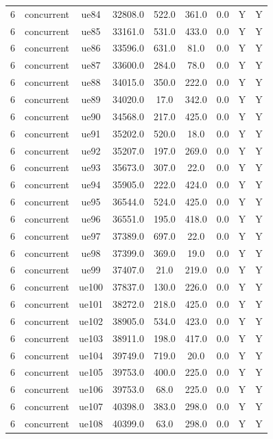 \begin{table}[ht]
\begin{tabular}{|c|c|c|c|c|c|c|c|c|}
6 & concurrent & ue84 & 32808.0 & 522.0 & 361.0 & 0.0 & Y & Y \\
6 & concurrent & ue85 & 33161.0 & 531.0 & 433.0 & 0.0 & Y & Y \\
6 & concurrent & ue86 & 33596.0 & 631.0 & 81.0 & 0.0 & Y & Y \\
6 & concurrent & ue87 & 33600.0 & 284.0 & 78.0 & 0.0 & Y & Y \\
6 & concurrent & ue88 & 34015.0 & 350.0 & 222.0 & 0.0 & Y & Y \\
6 & concurrent & ue89 & 34020.0 & 17.0 & 342.0 & 0.0 & Y & Y \\
6 & concurrent & ue90 & 34568.0 & 217.0 & 425.0 & 0.0 & Y & Y \\
6 & concurrent & ue91 & 35202.0 & 520.0 & 18.0 & 0.0 & Y & Y \\
6 & concurrent & ue92 & 35207.0 & 197.0 & 269.0 & 0.0 & Y & Y \\
6 & concurrent & ue93 & 35673.0 & 307.0 & 22.0 & 0.0 & Y & Y \\
6 & concurrent & ue94 & 35905.0 & 222.0 & 424.0 & 0.0 & Y & Y \\
6 & concurrent & ue95 & 36544.0 & 524.0 & 425.0 & 0.0 & Y & Y \\
6 & concurrent & ue96 & 36551.0 & 195.0 & 418.0 & 0.0 & Y & Y \\
6 & concurrent & ue97 & 37389.0 & 697.0 & 22.0 & 0.0 & Y & Y \\
6 & concurrent & ue98 & 37399.0 & 369.0 & 19.0 & 0.0 & Y & Y \\
6 & concurrent & ue99 & 37407.0 & 21.0 & 219.0 & 0.0 & Y & Y \\
6 & concurrent & ue100 & 37837.0 & 130.0 & 226.0 & 0.0 & Y & Y \\
6 & concurrent & ue101 & 38272.0 & 218.0 & 425.0 & 0.0 & Y & Y \\
6 & concurrent & ue102 & 38905.0 & 534.0 & 423.0 & 0.0 & Y & Y \\
6 & concurrent & ue103 & 38911.0 & 198.0 & 417.0 & 0.0 & Y & Y \\
6 & concurrent & ue104 & 39749.0 & 719.0 & 20.0 & 0.0 & Y & Y \\
6 & concurrent & ue105 & 39753.0 & 400.0 & 225.0 & 0.0 & Y & Y \\
6 & concurrent & ue106 & 39753.0 & 68.0 & 225.0 & 0.0 & Y & Y \\
6 & concurrent & ue107 & 40398.0 & 383.0 & 298.0 & 0.0 & Y & Y \\
6 & concurrent & ue108 & 40399.0 & 63.0 & 298.0 & 0.0 & Y & Y \\

\end{tabular}
\end{table}

